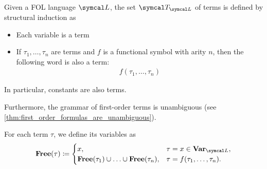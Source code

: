 \begin{definition}\label{def:first_order_term}\cite[definition 2.2]{Nerode2012}
  Given a FOL language \( \Cal{L} \), the set \( \Cal{T}_{\Cal{L}} \) of terms is defined by structural induction as
  \begin{itemize}
    \item Each variable is a term
    \item If \( \tau_1, \ldots, \tau_n \) are terms and \( f \) is a functional symbol with arity \( n \), then the following word is also a term:
    \begin{align*}
      f(\tau_1, \ldots, \tau_n)
    \end{align*}
  \end{itemize}

  In particular, constants are also terms.

  Furthermore, the grammar of first-order terms is unambiguous (see \cref{thm:first_order_formulas_are_unambiguous}).

  For each term \( \tau \), we define its variables as
  \begin{align*}
    \Bold{Free}(\tau) \coloneqq \begin{cases}
      x,                                                        &\tau = x \in \Bold{Var}_{\Cal{L}}, \\
      \Bold{Free}(\tau_1) \cup \ldots \cup \Bold{Free}(\tau_n), &\tau = f(\tau_1, \ldots, \tau_n).
    \end{cases}
  \end{align*}
\end{definition}

